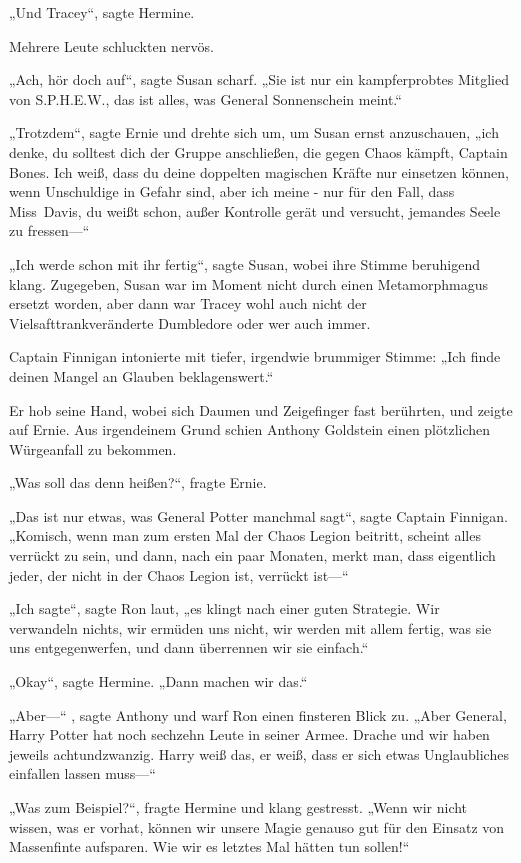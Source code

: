 {„Und Tracey“, sagte Hermine.

Mehrere Leute schluckten nervös.

„Ach, hör doch auf“, sagte Susan scharf. „Sie ist nur ein kampferprobtes Mitglied von S.P.H.E.W., das ist alles, was General Sonnenschein meint.“

„Trotzdem“, sagte Ernie und drehte sich um, um Susan ernst anzuschauen, „ich denke, du solltest dich der Gruppe anschließen, die gegen Chaos kämpft, Captain Bones. Ich weiß, dass du deine doppelten magischen Kräfte nur einsetzen können, wenn Unschuldige in Gefahr sind, aber ich meine - nur für den Fall, dass Miss~Davis, du weißt schon, außer Kontrolle gerät und versucht, jemandes Seele zu fressen—“

„Ich werde schon mit ihr fertig“, sagte Susan, wobei ihre Stimme beruhigend klang. Zugegeben, Susan war im Moment nicht durch einen Metamorphmagus ersetzt worden, aber dann war Tracey wohl auch nicht der Vielsafttrankveränderte Dumbledore oder wer auch immer.

Captain Finnigan intonierte mit tiefer, irgendwie brummiger Stimme: „Ich finde deinen Mangel an Glauben beklagenswert.“

Er hob seine Hand, wobei sich Daumen und Zeigefinger fast berührten, und zeigte auf Ernie. Aus irgendeinem Grund schien Anthony Goldstein einen plötzlichen Würgeanfall zu bekommen.

„Was soll das denn heißen?“, fragte Ernie.

„Das ist nur etwas, was General Potter manchmal sagt“, sagte Captain Finnigan. „Komisch, wenn man zum ersten Mal der Chaos Legion beitritt, scheint alles verrückt zu sein, und dann, nach ein paar Monaten, merkt man, dass eigentlich jeder, der nicht in der Chaos Legion ist, verrückt ist—“

„Ich sagte“, sagte Ron laut, „es klingt nach einer guten Strategie. Wir verwandeln nichts, wir ermüden uns nicht, wir werden mit allem fertig, was sie uns entgegenwerfen, und dann überrennen wir sie einfach.“

„Okay“, sagte Hermine. „Dann machen wir das.“

„Aber—“ , sagte Anthony und warf Ron einen finsteren Blick zu. „Aber General, Harry Potter hat noch sechzehn Leute in seiner Armee. Drache und wir haben jeweils achtundzwanzig. Harry weiß das, er weiß, dass er sich etwas Unglaubliches einfallen lassen muss—“

„Was zum Beispiel?“, fragte Hermine und klang gestresst. „Wenn wir nicht wissen, was er vorhat, können wir unsere Magie genauso gut für den Einsatz von Massenfinte aufsparen. Wie wir es letztes Mal hätten tun sollen!“

}
